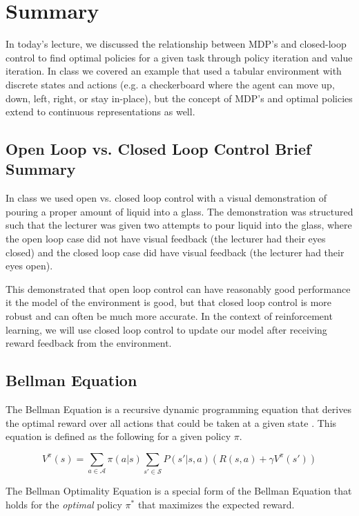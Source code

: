 \documentclass[11pt]{article}
\begin{document}

\section{Summary}


In today's lecture, we discussed the relationship between MDP's and closed-loop control to find optimal policies for a given task through policy iteration and value iteration. In class we covered an example that used a tabular environment with discrete states and actions (e.g. a checkerboard where the agent can move up, down, left, right, or stay in-place), but the concept of MDP's and optimal policies extend to continuous representations as well. 


\subsection{Open Loop vs. Closed Loop Control Brief Summary}
In class we used open vs. closed loop control with a visual demonstration of pouring a proper amount of liquid into a glass. The demonstration was structured such that the lecturer was given two attempts to pour liquid into the glass, where the open loop case did not have visual feedback (the lecturer had their eyes closed) and the closed loop case did have visual feedback (the lecturer had their eyes open).

This demonstrated that open loop control can have reasonably good performance it the model of the environment is good, but that closed loop control is more robust and can often be much more accurate. In the context of reinforcement learning, we will use closed loop control to update our model after receiving reward feedback from the environment.

\subsection{Bellman Equation}
The Bellman Equation is a recursive dynamic programming equation that derives the optimal reward over all actions that could be taken at a given state \cite{doi:10.1073/pnas.38.8.716}. This equation is defined as the following for a given policy $\pi$.

\begin{equation}
    V^{\pi}(s) = \sum_{a\in \mathcal{A}} \pi(a|s) \sum_{s'\in \mathcal{S}} P(s'|s,a)(R(s,a)+\gamma V^{\pi}(s'))
\end{equation}

The Bellman Optimality Equation is a special form of the Bellman Equation that holds for the \textit{optimal} policy $\pi^*$ that maximizes the expected reward.
\end{document}
